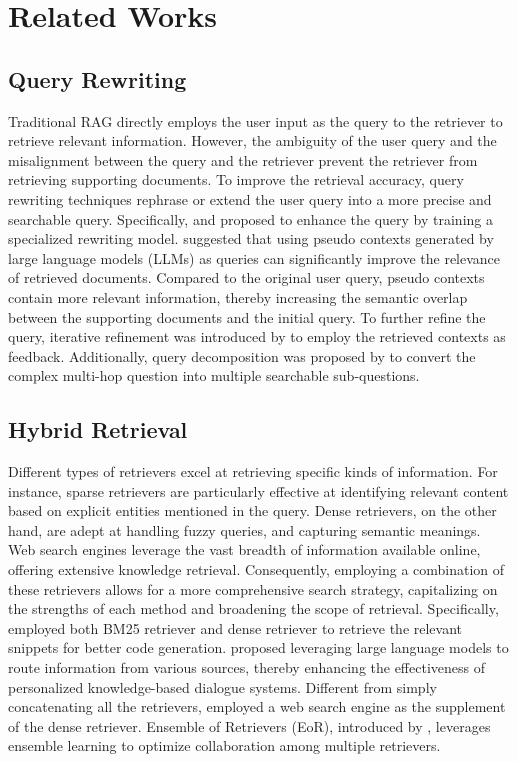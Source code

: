 \section{Related Works}
\subsection{Query Rewriting}
Traditional RAG directly employs the user input as the query to the retriever to retrieve relevant information. However, the ambiguity of the user query and the misalignment between the query and the retriever prevent the retriever from retrieving supporting documents. To improve the retrieval accuracy, query rewriting techniques rephrase or extend the user query into a more precise and searchable query.
Specifically, \citet{query_rewrite} and \citet{rafe} proposed to enhance the query by training a specialized rewriting model.
\citet{hyde,query2doc} suggested that using pseudo contexts generated by large language models (LLMs) as queries can significantly improve the relevance of retrieved documents. Compared to the original user query, pseudo contexts contain more relevant information, thereby increasing the semantic overlap between the supporting documents and the initial query. To further refine the query, iterative refinement was introduced by \citet{itrg,ircot,iter_retgen,blendfilter} to employ the retrieved contexts as feedback. Additionally, query decomposition was proposed by \citet{rq_rag} to convert the complex multi-hop question into multiple searchable sub-questions. 

\subsection{Hybrid Retrieval}
Different types of retrievers excel at retrieving specific kinds of information. For instance, sparse retrievers are particularly effective at identifying relevant content based on explicit entities mentioned in the query. Dense retrievers, on the other hand, are adept at handling fuzzy queries, and capturing semantic meanings. Web search engines leverage the vast breadth of information available online, offering extensive knowledge retrieval. Consequently, employing a combination of these retrievers allows for a more comprehensive search strategy, capitalizing on the strengths of each method and broadening the scope of retrieval.
Specifically, \citet{reacc,rapgen,bash_explainer,hybrid_code} employed both BM25 retriever and dense retriever to retrieve the relevant snippets for better code generation. \citet{unims_rag} proposed leveraging large language models to route information from various sources, thereby enhancing the effectiveness of personalized knowledge-based dialogue systems. Different from simply concatenating all the retrievers, \citet{crag} employed a web search engine as the supplement of the dense retriever. Ensemble of Retrievers (EoR), introduced by \citet{hybrid_dense}, leverages ensemble learning to optimize collaboration among multiple retrievers. 

